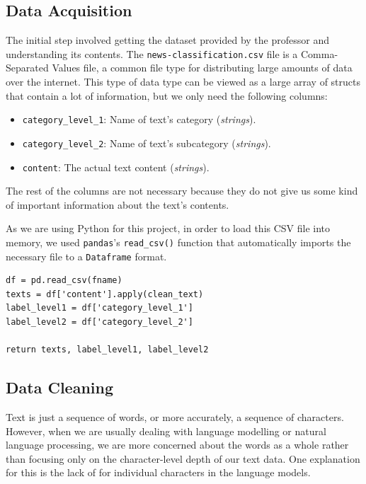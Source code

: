\subsection{Data Acquisition}
The initial step involved getting the dataset provided by the professor and understanding its contents. The \verb|news-classification.csv| file is a Comma-Separated Values file, a common file type for distributing large amounts of data over the internet. 
This type of data type can be viewed as a large array of structs that contain a lot of information, but we only need the following columns:
\begin{itemize}
	\item \verb|category_level_1|: Name of text's category (\textit{strings}).
	\item \verb|category_level_2|: Name of text's subcategory (\textit{strings}).
	\item \verb|content|: The actual text content (\textit{strings}).
\end{itemize}
The rest of the columns are not necessary because they do not give us some kind of important information about the text's contents.

As we are using Python for this project, in order to load this CSV file into memory, we used \verb|pandas|'s \verb|read_csv()| function that automatically imports the necessary file to a \verb|Dataframe| format.\\

\begin{lstlisting}
df = pd.read_csv(fname)
texts = df['content'].apply(clean_text)
label_level1 = df['category_level_1']
label_level2 = df['category_level_2']
	
return texts, label_level1, label_level2
\end{lstlisting}

\subsection{Data Cleaning}

Text is just a sequence of words, or more accurately, a sequence of characters. However, when we are usually dealing with language modelling or natural language processing, we are more concerned about the words as a whole rather than focusing only on the character-level depth of our text data. One explanation for this is the lack of  for individual characters in the language models.\\

